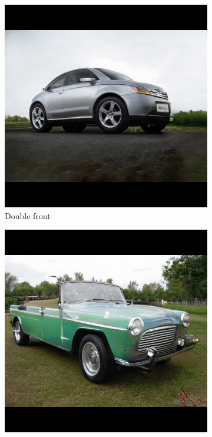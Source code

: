 \begin{figure}
\begin{subfigure}{.3\textwidth}
  \centering
  \includegraphics[width=\textwidth]{images/single2.png}
  \caption{Double front}
  \label{fig:survey_doublefront}
\end{subfigure}%
\hspace{.02\textwidth}
\begin{subfigure}{.3\textwidth}
  \centering
  \includegraphics[width=\textwidth]{images/single3.png}

\end{subfigure}
\end{figure}
